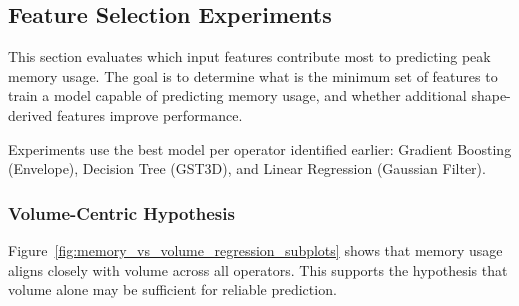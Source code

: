 \subsection{Feature Selection Experiments}
\label{subsec:pmc-results-feature-selection-experiments}

This section evaluates which input features contribute most to predicting peak memory usage.
The goal is to determine what is the minimum set of features to train a model capable of predicting memory usage, and whether additional shape-derived features improve performance.

Experiments use the best model per operator identified earlier: Gradient Boosting (Envelope), Decision Tree (\ac{GST3D}), and Linear Regression (Gaussian Filter).

\subsubsection{Volume-Centric Hypothesis}
\label{subsec:feature-selection-volume-centric-hypothesis}

Figure~\ref{fig:memory_vs_volume_regression_subplots} shows that memory usage aligns closely with volume across all operators.
This supports the hypothesis that volume alone may be sufficient for reliable prediction.

